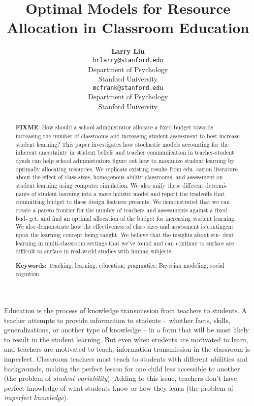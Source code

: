 \documentclass[10pt, letterpaper]{article}
\title{Optimal Models for Resource Allocation in Classroom Education}
\author{{\large \bf Larry Liu} \\ \texttt{hrlarry@stanford.edu} \\ Department of Psychology \\ Stanford University \And {\large \bf Michael C. Frank} \\ \texttt{mcfrank@stanford.edu} \\ Department of Psychology \\ Stanford University}
\begin{document}
\maketitle

\begin{abstract}
\textbf{FIXME}: How should a school administrator allocate a fixed
budget towards increasing the number of classrooms and increasing
student assessment to best increase student learning? This paper
investigates how stochastic models accounting for the inherent
uncertainty in student beliefs and teacher communication in
teacher-student dyads can help school administrators figure out how to
maximize student learning by optimally allocating resources. We
replicate existing results from edu- cation literature about the effect
of class sizes, homogenous ability classrooms, and assessment on student
learning using computer simulation. We also unify these different
determi- nants of student learning into a more holistic model and report
the tradeoffs that committing budget to these design features presents.
We demonstrated that we can create a pareto frontier for the number of
teachers and assessments against a fixed bud- get, and find an optimal
allocation of the budget for increasing student learning. We also
demonstrate how the effectiveness of class sizes and assessment is
contingent upon the learning concept being taught. We believe that the
insights about stu- dent learning in multi-classroom settings that we've
found and can continue to surface are difficult to surface in real-world
studies with human subjects.

\textbf{Keywords:}
Teaching; learning; education; pragmatics; Bayesian modeling; social
cognition
\end{abstract}

Education is the process of knowledge transmission from teachers to
students. A teacher attempts to provide information to students --
whether facts, skills, generalizations, or another type of knowledge --
in a form that will be most likely to result in the student learning.
But even when students are motivated to learn, and teachers are
motivated to teach, information transmission in the classroom is
imperfect. Classroom teachers must teach to students with different
abilities and backgrounds, making the perfect lesson for one child less
accessible to another (the problem of \emph{student variability}).
Adding to this issue, teachers don't have perfect knowledge of what
students know or how they learn (the problem of \emph{imperfect
knowledge}).
\end{document}
